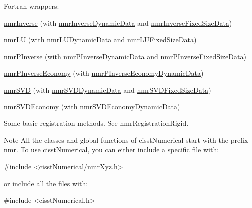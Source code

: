 \begin{DoxyItemize}
\begin{DoxyItemize}
\item Fortran wrappers\+: 
\begin{DoxyItemize}
\item \hyperlink{nmr_inverse_8h_a018d876444a46377abdd85e296643035}{nmr\+Inverse} (with \hyperlink{classnmr_inverse_dynamic_data}{nmr\+Inverse\+Dynamic\+Data} and \hyperlink{classnmr_inverse_fixed_size_data}{nmr\+Inverse\+Fixed\+Size\+Data}) 
\item \hyperlink{nmr_l_u_8h_a66bf403c705953a781e940cf1b674d5f}{nmr\+L\+U} (with \hyperlink{classnmr_l_u_dynamic_data}{nmr\+L\+U\+Dynamic\+Data} and \hyperlink{classnmr_l_u_fixed_size_data}{nmr\+L\+U\+Fixed\+Size\+Data}) 
\item \hyperlink{nmr_p_inverse_8h_a0694f8540c064c2aa6d8dbe488238462}{nmr\+P\+Inverse} (with \hyperlink{classnmr_p_inverse_dynamic_data}{nmr\+P\+Inverse\+Dynamic\+Data} and \hyperlink{classnmr_p_inverse_fixed_size_data}{nmr\+P\+Inverse\+Fixed\+Size\+Data}) 
\item \hyperlink{nmr_p_inverse_economy_8h_af93b2c1c9b8517e63053a1f6c18f8952}{nmr\+P\+Inverse\+Economy} (with \hyperlink{classnmr_p_inverse_economy_dynamic_data}{nmr\+P\+Inverse\+Economy\+Dynamic\+Data}) 
\item \hyperlink{nmr_s_v_d_8h_a52115d0e7a485c4494aa20f4f3f4ebe7}{nmr\+S\+V\+D} (with \hyperlink{classnmr_s_v_d_dynamic_data}{nmr\+S\+V\+D\+Dynamic\+Data} and \hyperlink{classnmr_s_v_d_fixed_size_data}{nmr\+S\+V\+D\+Fixed\+Size\+Data}) 
\item \hyperlink{nmr_s_v_d_economy_8h_a7a5496ff2d20946e8738baac82318603}{nmr\+S\+V\+D\+Economy} (with \hyperlink{classnmr_s_v_d_economy_dynamic_data}{nmr\+S\+V\+D\+Economy\+Dynamic\+Data}) 
\end{DoxyItemize}
\end{DoxyItemize}
\item Some basic registration methods. See nmr\+Registration\+Rigid.
\end{DoxyItemize}

\begin{DoxyNote}{Note}
All the classes and global functions of cisst\+Numerical start with the prefix nmr. To use cisst\+Numerical, you can either include a specific file with\+: 
\begin{DoxyCode}
\textcolor{preprocessor}{#include <cisstNumerical/nmrXyz.h>}
\end{DoxyCode}
 or include all the files with\+: 
\begin{DoxyCode}
\textcolor{preprocessor}{#include <cisstNumerical.h>}
\end{DoxyCode}
 
\end{DoxyNote}


